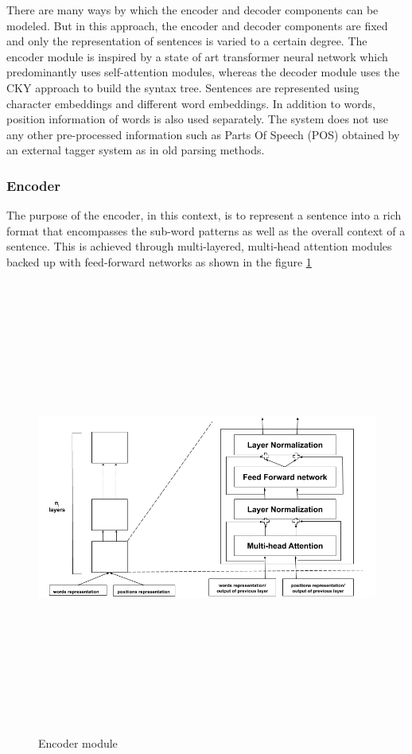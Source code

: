 \documentclass[a4paper, 11pt]{article}
\begin{document}
There are many ways by which the encoder and decoder components can be modeled. But in this approach, the encoder and decoder components are fixed and only the representation of sentences is varied to a certain degree. The encoder module is inspired by a state of art transformer neural network which predominantly uses self-attention modules, whereas the decoder module uses the CKY approach to build the syntax tree. Sentences are represented using character embeddings and different word embeddings. In addition to words, position information of words is also used separately. The system does not use any other pre-processed information such as Parts Of Speech (POS) obtained by an external tagger system as in old parsing methods.

\subsubsection{Encoder}

The purpose of the encoder, in this context, is to represent a sentence into a rich format that encompasses the sub-word patterns as well as the overall context of a sentence. This is achieved through multi-layered, multi-head attention modules backed up with feed-forward networks as shown in the figure \ref{fig:encoder_module}

\begin{figure}[htpb]
    \centering
    \includegraphics[width=\textwidth,height=15cm,keepaspectratio=true]
    {encoder.png}
    \caption{
        Encoder module
    }
    \label{fig:encoder_module}
\end{figure}
\end{document}

